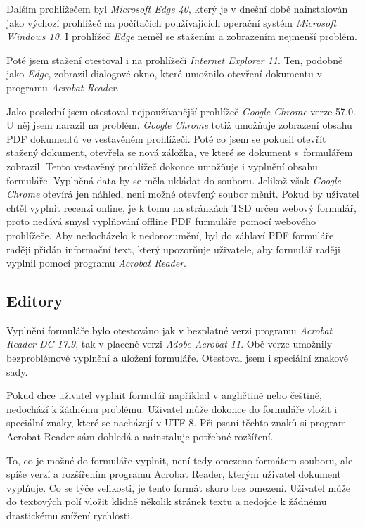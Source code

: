 \documentclass[czech,BP]{thesiskiv}
\begin{document}
Dalším prohlížečem byl \emph{Microsoft Edge 40}, který je v dnešní době nainstalován jako výchozí prohlížeč na počítačích používajících operační systém \emph{Microsoft Windows 10}. I prohlížeč \emph{Edge} neměl se stažením a zobrazením nejmenší problém. 

Poté jsem stažení otestoval i na prohlížeči \emph{Internet Explorer 11}. Ten, podobně jako \emph{Edge}, zobrazil dialogové okno, které umožnilo otevření dokumentu v programu \emph{Acrobat Reader}. 

Jako poslední jsem otestoval nejpoužívanější prohlížeč \emph{Google Chrome} verze 57.0. U něj jsem narazil na problém. \emph{Google Chrome} totiž umožňuje zobrazení obsahu PDF dokumentů ve vestavěném prohlížeči. Poté co jsem se pokusil otevřít stažený dokument, otevřela se nová záložka, ve které se dokument s~formulářem zobrazil. Tento vestavěný prohlížeč dokonce umožňuje i vyplnění obsahu formuláře. Vyplněná data by se měla ukládat do souboru. Jelikož však \emph{Google Chrome} otevírá jen náhled, není možné otevřený soubor měnit. Pokud by uživatel chtěl vyplnit recenzi online, je k tomu na stránkách TSD určen webový formulář, proto nedává smysl vyplňování offline PDF furmuláře pomocí webového prohlížeče. Aby nedocházelo k nedorozumění, byl do záhlaví PDF formuláře raději přidán informační text, který upozorňuje uživatele, aby formulář raději vyplnil pomocí programu \emph{Acrobat Reader}.
\subsection{Editory}
Vyplnění formuláře bylo otestováno jak v bezplatné verzi programu \emph{Acrobat Reader DC 17.9}, tak v placené verzi \emph{Adobe Acrobat 11}. Obě verze umožnily bezproblémové vyplnění a uložení formuláře. Otestoval jsem i speciální znakové sady. 

Pokud chce uživatel vyplnit formulář například v angličtině nebo češtině, nedochází k žádnému problému. Uživatel může dokonce do formuláře vložit i speciální znaky, které se nacházejí v UTF-8. Při psaní těchto znaků si program Acrobat Reader sám dohledá a nainstaluje potřebné rozšíření. 

To, co je možné do formuláře vyplnit, není tedy omezeno formátem souboru, ale spíše verzí a rozšířením programu Acrobat Reader, kterým uživatel dokument vyplňuje. Co se týče velikosti, je tento formát skoro bez omezení. Uživatel může do textových polí vložit klidně několik stránek textu a nedojde k žádnému drastickému snížení rychlosti. 
\end{document}
